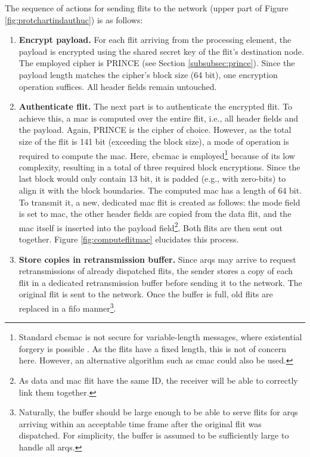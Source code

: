 The sequence of actions for sending flits to the network (upper part of Figure \ref{fig:protchartindauthuc}) is as follows:
\begin{enumerate}
    \item \textbf{Encrypt payload.} For each flit arriving from the processing element, the payload is encrypted using the shared secret key of the
        flit's destination node. The employed cipher is PRINCE (see Section \ref{subsubsec:prince}). Since the payload length matches the cipher's
        block size (64 bit), one encryption operation suffices. All header fields remain untouched.
    \item \textbf{Authenticate flit.} The next part is to authenticate the encrypted flit. To achieve this, a \gls{mac} is computed over the entire
        flit, i.e., all header fields and the payload. Again, PRINCE is the cipher of choice. However, as the total size of the flit is 141 bit
        (exceeding the block size), a mode of operation is required to compute the \gls{mac}. Here, \gls{cbcmac} is employed\footnote{Standard
        \gls{cbcmac} is not secure for variable-length messages, where existential forgery is possible \cite{wikilengthextattack}. As the flits have a
        fixed length, this is not of concern here. However, an alternative algorithm such as \gls{cmac} could also be used.} because of its low
        complexity, resulting in a total of three required block encryptions. Since the last block would only contain 13 bit, it is
        padded (e.g., with zero-bits) to align it with the block boundaries. The computed \gls{mac} has a length of 64 bit. To transmit it, a new, dedicated
        \gls{mac} flit is created as follows: the mode field is set to \gls{mac}, the other header fields are copied from the data flit, and the
        \gls{mac} itself is inserted into the payload field\footnote{As data and \gls{mac} flit have the same ID, the receiver will be able to
        correctly link them together.}. Both flits are then sent out together. Figure \vref{fig:computeflitmac} elucidates this process.
    \item \textbf{Store copies in retransmission buffer.} Since \glspl{arq} may arrive to request retransmissions of already dispatched flits, the
        sender stores a copy of each flit in a dedicated retransmission buffer before sending it to the network. The original flit is sent to the
        network. Once the buffer is full, old flits are replaced in a \gls{fifo} manner\footnote{Naturally, the buffer should be large enough to be
        able to serve flits for \glspl{arq} arriving within an acceptable time frame after the original flit was dispatched. For simplicity, the
        buffer is assumed to be sufficiently large to handle all \glspl{arq}.}.
\end{enumerate}
\vspace{0.5\baselineskip}

